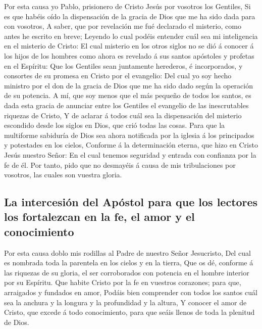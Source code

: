  Por esta causa yo Pablo, prisionero de Cristo Jesús por
vosotros los Gentiles,  Si es que habéis oído la
dispensación de la gracia de Dios que me ha sido dada para con vosotros,
 A saber, que por revelación me fué declarado el misterio,
como antes he escrito en breve;  Leyendo lo cual podéis
entender cuál sea mi inteligencia en el misterio de Cristo: 
El cual misterio en los otros siglos no se dió á conocer á los hijos de
los hombres como ahora es revelado á sus santos apóstoles y profetas en
el Espíritu:  Que los Gentiles sean juntamente herederos, é
incorporados, y consortes de su promesa en Cristo por el evangelio:
 Del cual yo soy hecho ministro por el don de la gracia de
Dios que me ha sido dado según la operación de su potencia. 
A mí, que soy menos que el más pequeño de todos los santos, es dada esta
gracia de anunciar entre los Gentiles el evangelio de las inescrutables
riquezas de Cristo,  Y de aclarar á todos cuál sea la
dispensación del misterio escondido desde los siglos en Dios, que crió
todas las cosas.  Para que la multiforme sabiduría de Dios
sea ahora notificada por la iglesia á los principados y potestades en
los cielos,  Conforme á la determinación eterna, que hizo
en Cristo Jesús nuestro Señor:  En el cual tenemos
seguridad y entrada con confianza por la fe de él.  Por
tanto, pido que no desmayéis á causa de mis tribulaciones por vosotros,
las cuales son vuestra gloria.

\hypertarget{la-intercesiuxf3n-del-apuxf3stol-para-que-los-lectores-los-fortalezcan-en-la-fe-el-amor-y-el-conocimiento}{%
\subsection{La intercesión del Apóstol para que los lectores los
fortalezcan en la fe, el amor y el
conocimiento}\label{la-intercesiuxf3n-del-apuxf3stol-para-que-los-lectores-los-fortalezcan-en-la-fe-el-amor-y-el-conocimiento}}

 Por esta causa doblo mis rodillas al Padre de nuestro
Señor Jesucristo,  Del cual es nombrada toda la parentela
en los cielos y en la tierra,  Que os dé, conforme á las
riquezas de su gloria, el ser corroborados con potencia en el hombre
interior por su Espíritu.  Que habite Cristo por la fe en
vuestros corazones; para que, arraigados y fundados en amor,
 Podáis bien comprender con todos los santos cuál sea la
anchura y la longura y la profundidad y la altura,  Y
conocer el amor de Cristo, que excede á todo conocimiento, para que
seáis llenos de toda la plenitud de Dios.

